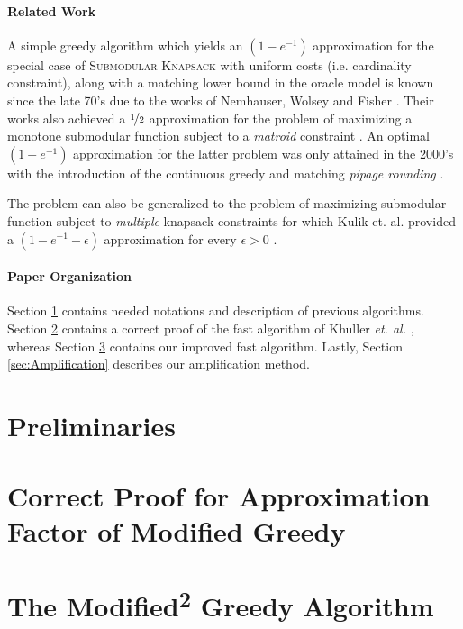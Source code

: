 \documentclass[a4paper,UKenglish,cleveref, autoref]{lipics-v2019}
\newcommand{\SK}{{\textsc{Submodular Knapsack}}\xspace}
\begin{document}
\paragraph*{Related Work}

A simple greedy algorithm which yields an $(1-e^{-1})$ approximation for the special
case of \SK with uniform costs (i.e. cardinality constraint), along with a matching 
lower bound in the oracle model is known since the late 70's due to the
works of Nemhauser, Wolsey and Fisher \cite{Nemhauser1978}\cite{NW78}.
Their works also achieved a $\nicefrac[]{1}{2}$ approximation for the problem
of maximizing a monotone submodular function subject to a {\em matroid}
constraint \cite{FNW78}. 
An optimal $(1-e^{-1})$ approximation for the latter problem was only attained in the 2000's with 
the introduction of the {continuous greedy} and matching 
	{\em pipage rounding } \cite{CCPV11}.

The problem can also be generalized to the problem of maximizing submodular function
subject to {\em multiple} knapsack constraints for which Kulik et. al. provided a $(1-e^{-1}-\epsilon)$ approximation for every $\epsilon>0$ \cite{KST13}.  


\paragraph*{Paper Organization}
Section \ref{sec:Preliminaries} contains needed notations and description of previous algorithms.
Section \ref{sec:ModifiedGreedy} contains a correct proof of the fast algorithm of Khuller {\em et. al.} \cite{khuller1999budgeted}, whereas Section \ref{sec:Modified2Greedy} contains our improved fast algorithm.
Lastly, Section \ref{sec:Amplification} describes our amplification method. 

\section{Preliminaries}\label{sec:Preliminaries}


\section{Correct Proof for Approximation Factor of Modified Greedy}\label{sec:ModifiedGreedy}


\section{The Modified\textsuperscript{2} Greedy Algorithm}\label{sec:Modified2Greedy}

\end{document}
